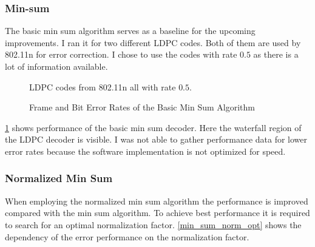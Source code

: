 \subsubsection{Min-sum}
The basic min sum algorithm serves as a baseline for the upcoming improvements. I ran it for two different LDPC codes. Both of them are used by 802.11n for error correction. I chose to use the codes with rate $0.5$ as there is a lot of information available.
\begin{figure}
    \centering

    LDPC codes from 802.11n all with rate $0.5$.
    \caption{Frame and Bit Error Rates of the Basic Min Sum Algorithm}
    \label{min_sum_base}
\end{figure}

\cref{min_sum_base} shows performance of the basic min sum decoder. Here the waterfall region of the LDPC decoder is visible. I was not able to gather performance data for lower error rates because the software implementation is not optimized for speed.

\subsubsection{Normalized Min Sum}
When employing the normalized min sum algorithm the performance is improved compared with the min sum algorithm. To achieve best performance it is required to search for an optimal normalization factor. \cref{min_sum_norm_opt} shows the dependency of the error performance on the normalization factor.

